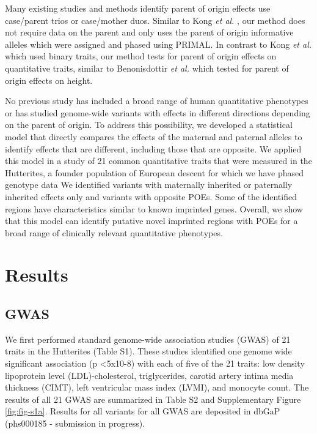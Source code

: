 Many existing studies and methods identify parent of origin effects use case/parent trios or case/mother duos\citep{Chuang:2017kp,Howey:2012hj,Ainsworth:2010bp,Weinberg:1999km,Weinberg:1998cf}. Similar to Kong \emph{et al.} \citep{Kong:2009kk}, our method does not require data on the parent and only uses the parent of origin informative alleles which were assigned and phased using PRIMAL\citep{Livne2015}.  In contrast to Kong \emph{et al.} \citep{Kong:2009kk} which used binary traits, our method tests for parent of origin effects on quantitative traits, similar to Benonisdottir \emph{et al.} \citep{Benonisdottir:2016dz} which tested for parent of origin effects on height.

No previous study has included a broad range of human quantitative phenotypes or has studied genome-wide variants with effects in different directions depending on the parent of origin. To address this possibility, we developed a statistical model that directly compares the effects of the maternal and paternal alleles to identify effects that are different, including those that are opposite. We applied this model in a study of 21 common quantitative traits that were measured in the Hutterites, a founder population of European descent for which we have phased genotype data \citep{Livne2015} We identified variants with maternally inherited or paternally inherited effects only and variants with opposite POEs. Some of the identified regions have characteristics similar to known imprinted genes. Overall, we show that this model can identify putative novel imprinted regions with POEs for a broad range of clinically relevant quantitative phenotypes.

\section{Results}\label{ch02-results}

\subsection{GWAS}\label{GWAS Results}
We first performed standard genome-wide association studies (GWAS) of 21 traits in the Hutterites (Table S1). These studies identified one genome wide significant association (p \textless 5x10-8) with each of five of the 21 traits: low density lipoprotein level (LDL)-cholesterol, triglycerides, carotid artery intima media thickness (CIMT), left ventricular mass index (LVMI), and monocyte count. The results of all 21 GWAS are summarized in Table S2 and Supplementary Figure \ref{fig:fig-s1a}. Results for all variants for all GWAS are deposited in dbGaP (phs000185 - submission in progress).

